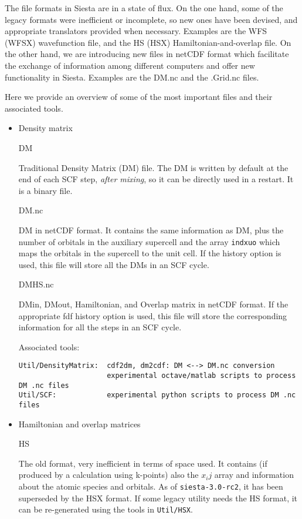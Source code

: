 \documentclass[11pt]{article}
\begin{document}
The file formats in Siesta are in a state of flux. On the one hand,
some of the legacy formats were inefficient or incomplete, so new ones
have been devised, and appropriate translators provided when
necessary.  Examples are the WFS (WFSX) wavefunction file, and the HS
(HSX) Hamiltonian-and-overlap file. On the other hand, we are
introducing new files in netCDF format which facilitate the exchange
of information among different computers and offer new functionality
in Siesta. Examples are the DM.nc and the .Grid.nc files.

Here we provide an overview of some of the most important files and their
associated tools.

\begin{itemize}
\item{Density matrix}

DM

Traditional Density Matrix (DM) file. The DM is written by default at
the end of each SCF step, {\em after mixing}, so it can be directly used
in a restart. It is a binary file.

DM.nc

DM in netCDF format. It contains the same information as DM, plus the
number of orbitals in the auxiliary supercell and the array {\tt indxuo}
which maps the orbitals in the supercell to the unit cell.  If the history
option is used, this file will store all the DMs in an SCF cycle.

DMHS.nc

DMin, DMout, Hamiltonian, and Overlap matrix in netCDF format. If the
appropriate fdf history option is used, this file will store the
corresponding information for all the steps in an SCF cycle.

Associated tools:

\begin{verbatim}
Util/DensityMatrix:  cdf2dm, dm2cdf: DM <--> DM.nc conversion
                     experimental octave/matlab scripts to process DM .nc files
Util/SCF:            experimental python scripts to process DM .nc files
\end{verbatim}

\item{Hamiltonian and overlap matrices}

HS

The old format, very inefficient in terms of space used. It contains
(if produced by a calculation using k-points) also the $x_ij$ array
and information about the atomic species and orbitals. As of
{\tt siesta-3.0-rc2}, it has been superseded by the HSX format. If some
legacy utility needs the HS format, it can be re-generated using
the tools in {\tt Util/HSX}.


\end{itemize}
\end{document}
